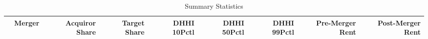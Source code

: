 \begin{table}[ht]
\centering
\begin{tabular}{rlrrrrrrr}
  \hline
 & Merger & Acquiror Share & Target Share & DHHI 10Pctl & DHHI 50Pctl & DHHI 99Pctl & Pre-Merger Rent & Post-Merger Rent \\ 
  \hline
\hline
\end{tabular}
\caption{Summary Statistics} 
\end{table}
